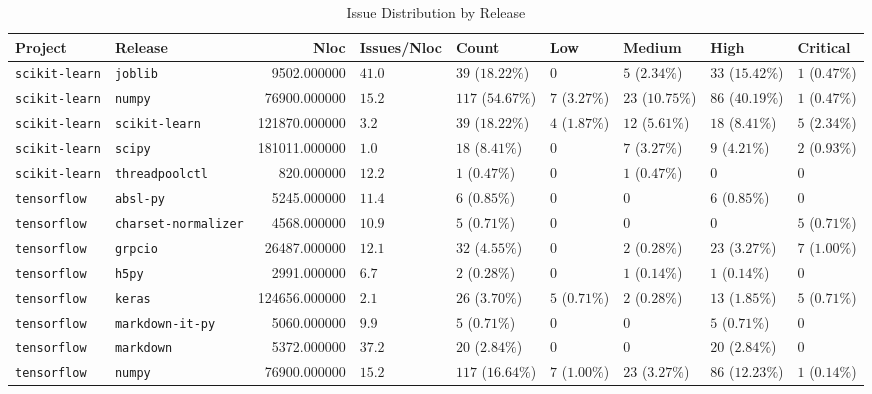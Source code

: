 \begin{table}
\caption{Issue Distribution by Release}
\label{tab:issue-release-distribution}
\begin{tabular}{llrllllll}
\toprule
Project & Release & Nloc & Issues/Nloc & Count & Low & Medium & High & Critical \\
\midrule
\texttt{scikit-learn} & \texttt{joblib} & 9502.000000 & $41.0$ & $39$ ($18.22\%$) & $0$ & $5$ ($2.34\%$) & $33$ ($15.42\%$) & $1$ ($0.47\%$) \\
\texttt{scikit-learn} & \texttt{numpy} & 76900.000000 & $15.2$ & $117$ ($54.67\%$) & $7$ ($3.27\%$) & $23$ ($10.75\%$) & $86$ ($40.19\%$) & $1$ ($0.47\%$) \\
\texttt{scikit-learn} & \texttt{scikit-learn} & 121870.000000 & $3.2$ & $39$ ($18.22\%$) & $4$ ($1.87\%$) & $12$ ($5.61\%$) & $18$ ($8.41\%$) & $5$ ($2.34\%$) \\
\texttt{scikit-learn} & \texttt{scipy} & 181011.000000 & $1.0$ & $18$ ($8.41\%$) & $0$ & $7$ ($3.27\%$) & $9$ ($4.21\%$) & $2$ ($0.93\%$) \\
\texttt{scikit-learn} & \texttt{threadpoolctl} & 820.000000 & $12.2$ & $1$ ($0.47\%$) & $0$ & $1$ ($0.47\%$) & $0$ & $0$ \\
\texttt{tensorflow} & \texttt{absl-py} & 5245.000000 & $11.4$ & $6$ ($0.85\%$) & $0$ & $0$ & $6$ ($0.85\%$) & $0$ \\
\texttt{tensorflow} & \texttt{charset-normalizer} & 4568.000000 & $10.9$ & $5$ ($0.71\%$) & $0$ & $0$ & $0$ & $5$ ($0.71\%$) \\
\texttt{tensorflow} & \texttt{grpcio} & 26487.000000 & $12.1$ & $32$ ($4.55\%$) & $0$ & $2$ ($0.28\%$) & $23$ ($3.27\%$) & $7$ ($1.00\%$) \\
\texttt{tensorflow} & \texttt{h5py} & 2991.000000 & $6.7$ & $2$ ($0.28\%$) & $0$ & $1$ ($0.14\%$) & $1$ ($0.14\%$) & $0$ \\
\texttt{tensorflow} & \texttt{keras} & 124656.000000 & $2.1$ & $26$ ($3.70\%$) & $5$ ($0.71\%$) & $2$ ($0.28\%$) & $13$ ($1.85\%$) & $5$ ($0.71\%$) \\
\texttt{tensorflow} & \texttt{markdown-it-py} & 5060.000000 & $9.9$ & $5$ ($0.71\%$) & $0$ & $0$ & $5$ ($0.71\%$) & $0$ \\
\texttt{tensorflow} & \texttt{markdown} & 5372.000000 & $37.2$ & $20$ ($2.84\%$) & $0$ & $0$ & $20$ ($2.84\%$) & $0$ \\
\texttt{tensorflow} & \texttt{numpy} & 76900.000000 & $15.2$ & $117$ ($16.64\%$) & $7$ ($1.00\%$) & $23$ ($3.27\%$) & $86$ ($12.23\%$) & $1$ ($0.14\%$) \\

\end{tabular}
\end{table}
